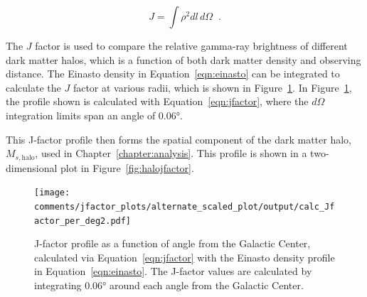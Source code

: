     \begin{equation}\label{eqn:jfactor}
      J = \int \rho^2 dl\,d\Omega \;\; .
    \end{equation}

    The $J$ factor is used to compare the relative gamma-ray brightness of different dark matter halos, which is a function of both dark matter density and observing distance.
    The Einasto density in Equation~\ref{eqn:einasto} can be integrated to calculate the $J$ factor at various radii, which is shown in Figure~\ref{fig:gchalo_jfactor}.
    In Figure~\ref{fig:gchalo_jfactor}, the profile shown is calculated with Equation~\ref{eqn:jfactor}, where the $d\Omega$ integration limits span an angle of \ang{0.06}.
    
    This J-factor profile then forms the spatial component of the dark matter halo, $M_{s,\textrm{halo}}$, used in Chapter~\ref{chapter:analysis}.
    This profile is shown in a two-dimensional plot in Figure~\ref{fig:halojfactor}.
    
    \begin{figure}[!t]
    \centering
      \texttt{[image: comments/jfactor\_plots/alternate\_scaled\_plot/output/calc\_Jfactor\_per\_deg2.pdf]}
      \caption[Galactic Center Einasto Halo J-Factor]{
        J-factor profile as a function of angle from the Galactic Center, calculated via Equation~\ref{eqn:jfactor} with the Einasto density profile in Equation~\ref{eqn:einasto}.
        The J-factor values are calculated by integrating \ang{0.06} around each angle from the Galactic Center.
      }
      \label{fig:gchalo_jfactor}
    \end{figure}
  

